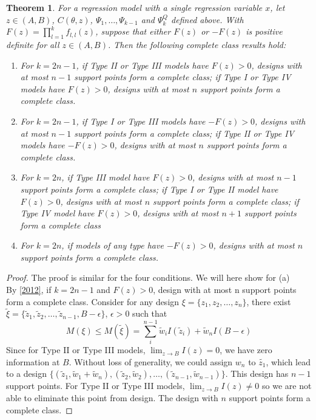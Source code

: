 \documentclass[11pt]{amsart}
\newtheorem{theorem}{Theorem}[section]
\theoremstyle{definition}
\theoremstyle{remark}
\begin{document}
\begin{theorem}\label{2012open}
For a regression model with a single regression variable $x$, let $z\in(A,B)$, $C(\theta,z)$, $\Psi_1,\ldots, \Psi_{k-1}$ and $\Psi_k^Q$ defined above. With  $F(z) = \prod_{l=1}^k f_{l,l}(z)$, suppose that either $F(z)$ or $-F(z)$ is positive definite for all $z\in (A,B)$. Then the following complete class results hold:\begin{enumerate}
\item[(a)] For $k= 2n-1$, if Type II or Type III models have $F(z)>0$,  designs with at most $n-1$ support points form a complete class; if Type I or Type IV models have $F(z)>0$,  designs with at most $n$ support points form a complete class. 
\item[(b)] For $k= 2n-1$, if Type I or Type III models have $-F(z)>0$,  designs with at most $n-1$ support points form a complete class; if Type II or Type IV models have $-F(z)>0$,  designs with at most $n$ support points form a complete class. 
\item[(c)] For $k = 2n$, if Type III model have $F(z)>0$, designs with at most $n-1$ support points form a complete class; if Type I or Type II model have $F(z)>0$, designs with at most $n$ support points form a complete class; if Type IV model have $F(z)>0$, designs with at most $n+1$ support points form a complete class
\item[(d)] For $k = 2n$, if models of any type have $-F(z)>0$, designs with at most $n$ support points form a complete class.
\end{enumerate}
\end{theorem}
\begin{proof} 
The proof is similar for the four conditions. We will here show for (a)  \\
By \ref{2012}, if $k = 2n-1$ and $F(z)>0$, design with at most n support points form a complete class. Consider for any design $\xi = \{z_1,z_2,\ldots, z_n\}$, there exist $\tilde{\xi} = \{\tilde{z}_1,\tilde{z}_2,\ldots, \tilde{z}_{n-1}, B-\epsilon\}$, $\epsilon>0$ such that \[M(\xi)\le M(\tilde{\xi}) =\sum_i^{n-1} \tilde{w}_iI(\tilde{z}_i)+\tilde{w}_nI(B-\epsilon) \] 
Since for Type II or Type III models,  $\lim_{z\to B}I(z)=0$, we have zero information at $B$. Without loss of generality, we could assign $w_n$ to $\tilde{z_1}$, which lead to a design $\{(\tilde{z}_1, \tilde{w}_1+\tilde{w}_n), (\tilde{z}_2, \tilde{w}_2),\ldots,(\tilde{z}_{n-1}, \tilde{w}_{n-1}) \}$. This design has $n-1$ support points. 
For Type II or Type III models, $\lim_{z\to B}I(z)\ne0$ so we are not able to eliminate this point from design. The design with $n$ support points form a complete class.
\end{proof}
\end{document}
